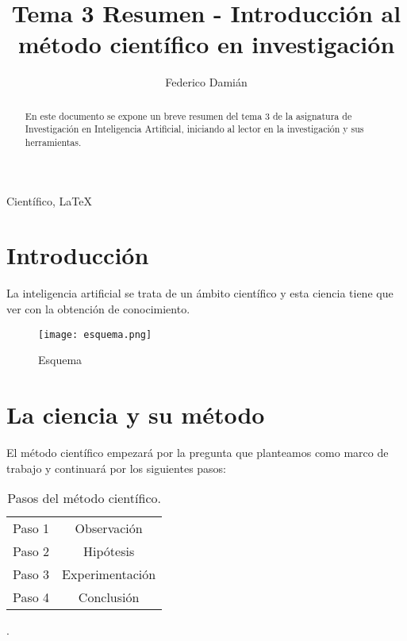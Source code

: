 \documentclass[review]{elsarticle}
\begin{document}
\begin{frontmatter}

\title{Tema 3 Resumen - Introducción al método científico en investigación}

\author{Federico Damián}




\renewcommand{\abstractname}{}    %
\begin{abstract}
	En este documento se expone un breve resumen del tema 3 de la asignatura de Investigación en Inteligencia Artificial, iniciando al lector en la investigación y sus herramientas.\cite{UNED,tema}
\end{abstract}



\begin{keyword}
Científico, \LaTeX\
\end{keyword}

\end{frontmatter}

\linenumbers

\section{Introducción}
La inteligencia artificial se trata de un ámbito
científico y esta ciencia tiene que ver con la obtención de conocimiento.\cite{WEBSITE:2}

\begin{figure}[htb]
	\centering	\texttt{[image: esquema.png]}
	\caption{Esquema}
	\label{Esquema}
\end{figure}

\section{La ciencia y su método}
El método científico empezará por la pregunta que planteamos como marco de trabajo y continuará por los siguientes pasos:\cite{WEBSITE:1}

\begin{table}[h!]
	\begin{center}

		\begin{tabular}{l|c}
			Paso 1 & Observación\\
			Paso 2 & Hipótesis\\
			Paso 3 & Experimentación\\
			Paso 4 & Conclusión\\
			
		\end{tabular}
	\caption{Pasos del método científico.}
	\label{tab:Pasos del metodo}
	\end{center}
\end{table}.
\end{document}
